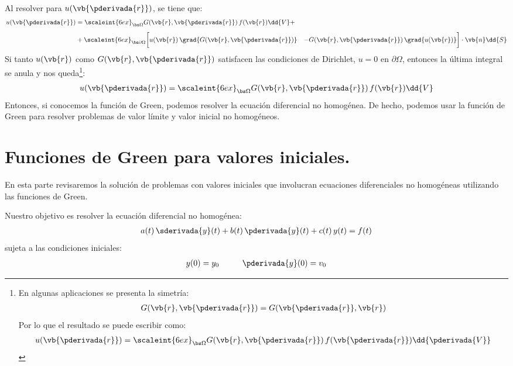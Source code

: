 Al resolver para $u (\vb{\pderivada{r}})$, se tiene que:
\begin{align}
\begin{aligned}
u (\vb{\pderivada{r}}) &= \scaleint{6ex}_{\bs \Omega} G (\vb{r}, \vb{\pderivada{r}}) \, f (\vb{r}) \dd{V} + \\[0.5em]
&+ \scaleint{6ex}_{\bs \partial \Omega} \bigg[ u (\vb{r}) \, \grad{G (\vb{r}, \vb{\pderivada{r}})} &- G (\vb{r}, \vb{\pderivada{r}}) \, \grad{u (\vb{r})} \bigg] \cdot \vb{n} \dd{S}
\end{aligned}
\label{eq:ecuacion_07_03}
\end{align}
Si tanto $u (\vb{r})$ como $G (\vb{r}, \vb{\pderivada{r}})$ satisfacen las condiciones de Dirichlet, $u = 0$ en $\partial \Omega$, entonces la última integral se anula y nos queda\footnote{En algunas aplicaciones se presenta la simetría:
\begin{align*}
G (\vb{r}, \vb{\pderivada{r}}) = G (\vb{\pderivada{r}}, \vb{r})
\end{align*}
Por lo que el resultado se puede escribir como:
\begin{align*}
u (\vb{\pderivada{r}}) = \scaleint{6ex}_{\bs \Omega} G (\vb{r}, \vb{\pderivada{r}}) \, f (\vb{\pderivada{r}}) \dd{\pderivada{V}}
\end{align*}
}:
\begin{align*}
u (\vb{\pderivada{r}}) = \scaleint{6ex}_{\bs \Omega} G (\vb{r}, \vb{\pderivada{r}}) \, f (\vb{r}) \dd{V}
\end{align*}
Entonces, si conocemos la función de Green, podemos resolver la ecuación diferencial no homogénea. De hecho, podemos usar la función de Green para resolver problemas de valor límite y valor inicial no homogéneos.

\section{Funciones de Green para valores iniciales.}

En esta parte revisaremos la solución de problemas con valores iniciales que involucran ecuaciones diferenciales no homogéneas utilizando las funciones de Green.
\par
Nuestro objetivo es resolver la ecuación diferencial no homogénea:
\begin{align}
a (t) \, \sderivada{y} (t) + b (t) \, \pderivada{y} (t) + c (t) \, y (t) = f (t)
\label{eq:ecuacion_07_04}
\end{align}
sujeta a las condiciones iniciales:
\begin{align*}
y (0) = y_{0} \hspace{1cm} \pderivada{y} (0) = v_{0}
\end{align*}

